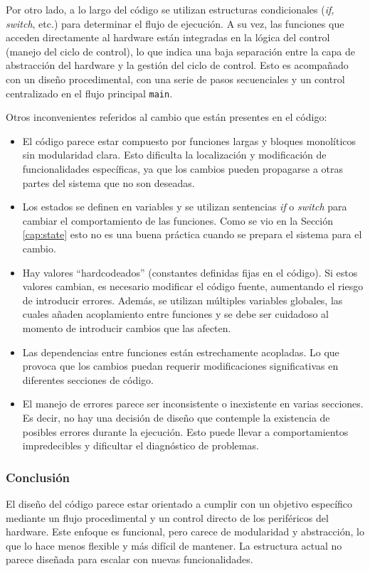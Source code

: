 Por otro lado, a lo largo del código se utilizan estructuras condicionales (\textit{if, switch}, etc.) para determinar el flujo de ejecución. A su vez, las funciones que acceden directamente al hardware están integradas en la lógica del control (manejo del ciclo de control), lo que indica una baja separación entre la capa de abstracción del hardware y la gestión del ciclo de control. Esto es acompañado con un diseño procedimental, con una serie de pasos secuenciales y un control centralizado en el flujo principal \verb|main|.

Otros inconvenientes referidos al cambio que están presentes en el código:
\begin{itemize}
\item El código parece estar compuesto por funciones largas y bloques monolíticos sin modularidad clara. Esto dificulta la localización y modificación de funcionalidades específicas, ya que los cambios pueden propagarse a otras partes del sistema que no son deseadas.
\item Los estados se definen en variables y se utilizan sentencias \textit{if} o \textit{switch} para cambiar el comportamiento de las funciones. Como se vio en la Sección \ref{cap:state} esto no es una buena práctica cuando se prepara el sistema para el cambio.
\item Hay valores ``hardcodeados'' (constantes definidas fijas en el código). Si estos valores cambian, es necesario modificar el código fuente, aumentando el riesgo de introducir errores. Además, se utilizan múltiples variables globales, las cuales añaden acoplamiento entre funciones y se debe ser cuidadoso al momento de introducir cambios que las afecten.
\item Las dependencias entre funciones están estrechamente acopladas. Lo que provoca que los cambios puedan requerir modificaciones significativas en diferentes secciones de código.
\item El manejo de errores parece ser inconsistente o inexistente en varias secciones. Es decir, no hay una decisión de diseño que contemple la existencia de posibles errores durante la ejecución. Esto puede llevar a comportamientos impredecibles y dificultar el diagnóstico de problemas.
\end{itemize}

\subsubsection*{Conclusión}

El diseño del código parece estar orientado a cumplir con un objetivo específico mediante un flujo procedimental y un control directo de los periféricos del hardware. Este enfoque es funcional, pero carece de modularidad y abstracción, lo que lo hace menos flexible y más difícil de mantener. La estructura actual no parece diseñada para escalar con nuevas funcionalidades.

